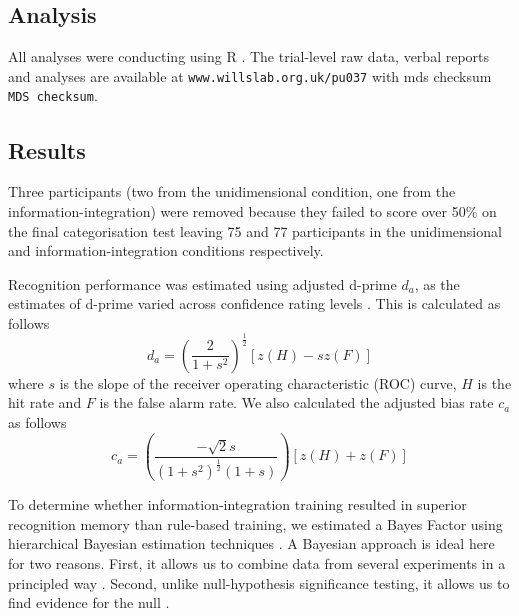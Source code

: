 \documentclass[12pt]{article}
\begin{document}

\subsection{Analysis}
All analyses were conducting using R \cite{Rcore}. The trial-level raw data, verbal reports and analyses are available at \texttt{www.willslab.org.uk/pu037} with mds checksum \texttt{MDS checksum}. 

\subsection{Results} \label{section:results}
Three participants (two from the unidimensional condition, one from the information-integration) were removed because they failed to score over 50\% on the final categorisation test leaving 75 and 77 participants in the unidimensional and information-integration conditions respectively. 

Recognition performance was estimated using adjusted d-prime $d_a$, as the estimates of d-prime varied across confidence rating levels \cite{Macmillan2005}. This is calculated as follows
\begin{equation}\label{eqn:d_a}
	d_a = \left( \frac{2}{1+s^2} \right)^\frac{1}{2} \left[ z(H) - s z(F) \right]
\end{equation}
where $s$ is the slope of the receiver operating characteristic (ROC) curve, $H$ is the hit rate and $F$ is the false alarm rate. We also calculated the adjusted bias rate $c_a$ as follows
\begin{equation}\label{eqn:c_a}
c_a = \left( \frac{-\sqrt{2}s}{(1+s^2)^\frac{1}{2}(1+s)} \right) \left[ z(H) + z(F) \right]
\end{equation}

To determine whether information-integration training resulted in superior recognition memory than rule-based training, we estimated a Bayes Factor using hierarchical Bayesian estimation techniques \cite{Kruschke2015, Rouder:2018cz}. A Bayesian approach is ideal here for two reasons. First, it allows us to combine data from several experiments in a principled way \cite{Kruschke2015}. Second, unlike null-hypothesis significance testing, it allows us to find evidence for the null \cite{Dienes2011}. 
\end{document}
